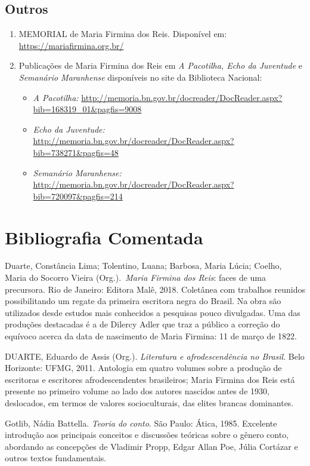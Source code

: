 \documentclass[12pt]{extarticle}
\begin{document}
\subsection{Outros}

\begin{enumerate}
\item
  MEMORIAL de Maria Firmina dos Reis. Disponível em:
  \url{https://mariafirmina.org.br/}
\item
  Publicações de Maria Firmina dos Reis em \emph{A Pacotilha, Echo da
  Juventude} e \emph{Semanário Maranhense} disponíveis no site da
  Biblioteca Nacional:

  \begin{itemize}
  \item
    \emph{A Pacotilha:}
    \url{http://memoria.bn.gov.br/docreader/DocReader.aspx?bib=168319_01\&pagfis=9008}
  \item
    \emph{Echo da Juventude:}
    \url{http://memoria.bn.gov.br/docreader/DocReader.aspx?bib=738271\&pagfis=48}
  \item
    \emph{Semanário Maranhense:}
    \url{http://memoria.bn.gov.br/docreader/DocReader.aspx?bib=720097\&pagfis=214}
  \end{itemize}
\end{enumerate}

\section{Bibliografia Comentada}

Duarte, Constância Lima; Tolentino, Luana; Barbosa, Maria Lúcia; Coelho,
Maria do Socorro Vieira (Org.).\emph{~Maria Firmina dos Reis}: faces de
uma precursora. Rio de Janeiro: Editora Malê, 2018. Coletânea com
trabalhos reunidos possibilitando um regate da primeira escritora negra
do Brasil. Na obra são utilizados desde estudos mais conhecidos a
pesquisas pouco divulgadas. Uma das produções destacadas é a de Dilercy
Adler que traz a público a correção do equívoco acerca da data de
nascimento de Maria Firmina: 11 de março de 1822.

DUARTE, Eduardo de Assis (Org.). \emph{Literatura e afrodescendência no
Brasil}. Belo Horizonte: UFMG, 2011. Antologia em quatro volumes sobre a
produção de escritoras e escritores afrodescendentes brasileiros; Maria
Firmina dos Reis está presente no primeiro volume ao lado dos autores
nascidos antes de 1930, deslocados, em termos de valores socioculturais,
das elites brancas dominantes.

Gotlib, Nádia Battella. \emph{Teoria do conto}. São Paulo: Ática, 1985.
Excelente introdução aos principais conceitos e discussões teóricas
sobre o gênero conto, abordando as concepções de Vladimir Propp, Edgar
Allan Poe, Júlia Cortázar e outros textos fundamentais.
\end{document}
